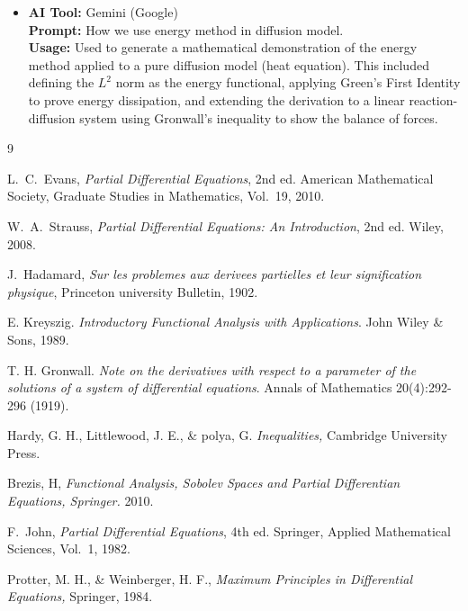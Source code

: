 \documentclass[12pt,a4paper]{article}
\theoremstyle{plain}
\theoremstyle{definition}
\begin{document}
\begin{itemize}
    \item \textbf{AI Tool:} Gemini (Google) \\
    \textbf{Prompt:} How we use energy method in diffusion model. \\
    \textbf{Usage:} Used to generate a mathematical demonstration of the energy method applied to a pure diffusion model (heat equation). This included defining the $L^2$ norm as the energy functional, applying Green's First Identity to prove energy dissipation, and extending the derivation to a linear reaction-diffusion system using Gronwall's inequality to show the balance of forces.
    
\end{itemize}

\begin{thebibliography}{9}

L.~C.~Evans, \textit{Partial Differential Equations}, 2nd ed.
American Mathematical Society, Graduate Studies in Mathematics, Vol.~19, 2010.

W.~A.~Strauss, \textit{Partial Differential Equations: An Introduction}, 2nd ed.
Wiley, 2008.

J.~Hadamard,
\emph{Sur les problemes aux derivees partielles et leur signification physique},
Princeton university Bulletin, 1902.

E. Kreyszig. \emph{Introductory Functional Analysis with Applications}. John Wiley \& Sons, 1989.

 T. H. Gronwall. \emph{Note on the derivatives with respect to a parameter of the solutions of a system of differential equations}. Annals of Mathematics 20(4):292-296 (1919).

Hardy, G. H., Littlewood, J. E., \& polya, G. \emph{Inequalities,} Cambridge University Press.

Brezis, H, \emph{Functional Analysis, Sobolev Spaces and Partial Differentian Equations, Springer.} 2010.

F.~John, \textit{Partial Differential Equations}, 4th ed.
Springer, Applied Mathematical Sciences, Vol.~1, 1982.

Protter, M. H., \& Weinberger, H. F., \emph{Maximum Principles in Differential Equations,} Springer, 1984.

\end{thebibliography}
\end{document}
